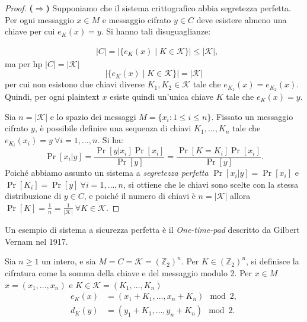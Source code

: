 \begin{proof}
    \textbf{($\Rightarrow$)} Supponiamo che il sistema crittografico abbia segretezza perfetta. \\ Per ogni messaggio $x \in M$ e messaggio cifrato $y \in C$ deve esistere almeno una chiave per cui $e_K(x) = y$. Si hanno tali disuguaglianze:

    \begin{align*}
        &|C| = |\{ e_K(x) \mid K \in \mathcal{K}\}| \leq |\mathcal{K}|,    
    \end{align*} ma per hp $|C| = |\mathcal{K}|$
    \[
        |\{ e_K(x) \mid K \in \mathcal{K}\}| = |\mathcal{K}| 
    \]
    per cui non esistono due chiavi diverse $K_1,K_2 \in \mathcal{K}$ tale che $e_{K_1}(x) = e_{K_2}(x)$.\\ Quindi, per ogni plaintext $x$ esiste quindi un'unica chiave $K$ tale che $e_K(x) = y$.
    
    \vspace{1em} \noindent Sia $n = |\mathcal{K}|$ e lo spazio dei messaggi $M = \{x_i: 1 \leq i \leq n\}$. Fissato un messaggio cifrato $y$, è possibile definire una sequenza di chiavi $K_1,\dots,K_n$ tale che $e_{K_i}(x_i) = y \ \forall i = 1,\dots,n$. Si ha:
    \[
        \Pr[x_i | y] = \frac{\Pr[y | x_i]\Pr[x_i]}{\Pr[y]} = \frac{\Pr[K = K_i]\Pr[x_i]}{\Pr[y]}.
    \]
    Poiché abbiamo assunto un sistema a \emph{segretezza perfetta} $\Pr[x_i | y] = \Pr[x_i]$ e $\Pr[K_i] = \Pr[y]\ \forall i = 1,\dots,n$, si ottiene che le chiavi sono scelte con la stessa distribuzione di $y \in C$, e poiché il numero di chiavi è $n=|\mathcal{K}|$ allora $\Pr[K] = \frac{1}{n}=\frac{1}{|\mathcal{K}|} \ \forall K \in \mathcal{K}$.
\end{proof}

\vspace{1em} \noindent Un esempio di sistema a sicurezza perfetta è il \emph{One-time-pad} descritto da Gilbert Vernam nel 1917.

\begin{definition}
    Sia $n \geq 1$ un intero, e sia $M = C = \mathcal{K} = (\mathbb{Z}_{2})^n$. Per $K \in (\mathbb{Z}_{2})^n$, si definisce la cifratura come la somma della chiave e del messaggio modulo 2. Per $x \in M$ $x = (x_1,\dots,x_n)$ e $K \in \mathcal{K}= (K_1,\dots,K_n)$
    \begin{align*}
        e_K(x) &= (x_1 + K_1, \dots, x_n + K_n) \mod 2,\\
        d_K(y) &= (y_1 + K_1, \dots, y_n + K_n) \mod 2.\\
    \end{align*}
\end{definition}


